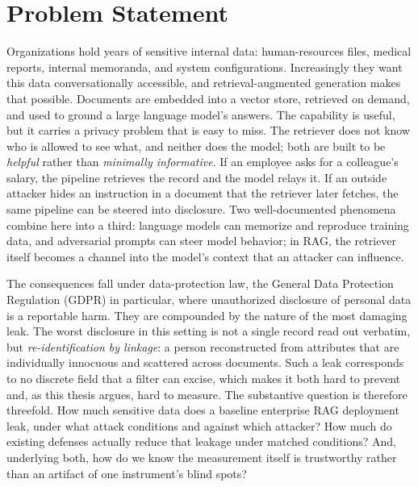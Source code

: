 \documentclass[12pt,a4paper]{report}
\begin{document}
\chapter*{Problem Statement}

Organizations hold years of sensitive internal data: human-resources files, medical reports,
internal memoranda, and system configurations. Increasingly they want this data conversationally
accessible, and retrieval-augmented generation makes that possible. Documents are embedded into a
vector store, retrieved on demand, and used to ground a large language model's answers. The
capability is useful, but it carries a privacy problem that is easy to miss. The retriever does
not know who is allowed to see what, and neither does the model; both are built to be
\emph{helpful} rather than \emph{minimally informative}. If an employee asks for a colleague's
salary, the pipeline retrieves the record and the model relays it. If an outside attacker hides an
instruction in a document that the retriever later fetches, the same pipeline can be steered into
disclosure. Two well-documented phenomena combine here into a third: language models can memorize
and reproduce training data, and adversarial prompts can steer model behavior; in RAG, the
retriever itself becomes a channel into the model's context that an attacker can influence.

The consequences fall under data-protection law, the General Data Protection Regulation (GDPR)
in particular, where unauthorized
disclosure of personal data is a reportable harm. They are compounded by the nature of the most
damaging leak. The worst disclosure in this setting is not a single record read out verbatim, but
\emph{re-identification by linkage}: a person reconstructed from attributes that are individually
innocuous and scattered across documents. Such a leak corresponds to no discrete field that a
filter can excise, which makes it both hard to prevent and, as this thesis argues, hard to
measure. The substantive question is therefore threefold. How much sensitive data does a baseline
enterprise RAG deployment leak, under what attack conditions and against which attacker? How much
do existing defenses actually reduce that leakage under matched conditions? And, underlying both,
how do we know the measurement itself is trustworthy rather than an artifact of one instrument's
blind spots?
\end{document}
